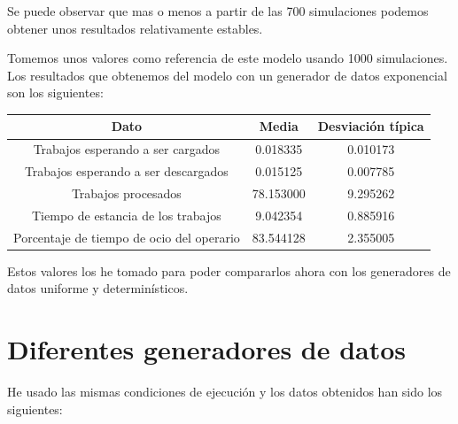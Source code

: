 \documentclass[11pt,a4paper]{report}
\begin{document}
Se puede observar que mas o menos a partir de las 700 simulaciones podemos obtener unos resultados relativamente estables.

Tomemos unos valores como referencia de este modelo usando 1000 simulaciones. Los resultados que obtenemos del modelo con un generador de datos exponencial son los siguientes:
\begin{center}
	\begin{tabular}{|c|c|c|}
	\hline
		\textbf{Dato} & \textbf{Media} & \textbf{Desviación típica}\\
	\hline
		Trabajos esperando a ser cargados & 0.018335 & 0.010173\\
	\hline
		Trabajos esperando a ser descargados & 0.015125 & 0.007785\\
	\hline
		Trabajos procesados & 78.153000 & 9.295262\\
	\hline
		Tiempo de estancia de los trabajos & 9.042354 & 0.885916\\
	\hline
		Porcentaje de tiempo de ocio del operario & 83.544128 & 2.355005\\
	\hline
	\end{tabular}
\end{center}


Estos valores los he tomado para poder compararlos ahora con los generadores de datos uniforme y determinísticos.

\section{Diferentes generadores de datos}

He usado las mismas condiciones de ejecución y los datos obtenidos han sido los siguientes:
\end{document}
